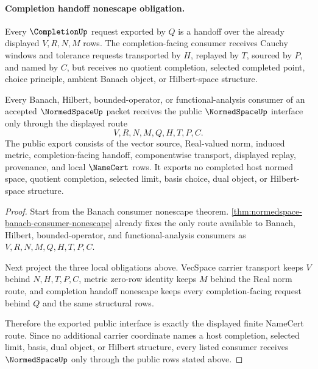 \paragraph{Completion handoff nonescape obligation.}
Every $\CompletionUp$ request exported by $Q$ is a handoff over the already displayed $V,R,N,M$ rows. The completion-facing consumer receives Cauchy windows and tolerance requests transported by $H$, replayed by $T$, sourced by $P$, and named by $C$, but receives no quotient completion, selected completed point, choice principle, ambient Banach object, or Hilbert-space structure.

\begin{theorem}
\label{thm:normed-space-public-namecert-export}
Every Banach, Hilbert, bounded-operator, or functional-analysis consumer of an
accepted $\NormedSpaceUp$ packet receives the public $\NormedSpaceUp$ interface
only through the displayed route
$$
V,R,N,M,Q,H,T,P,C .
$$
The public export consists of the vector source, Real-valued norm, induced
metric, completion-facing handoff, componentwise transport, displayed replay,
provenance, and local $\NameCert$ rows. It exports no completed host normed
space, quotient completion, selected limit, basis choice, dual object, or
Hilbert-space structure.
\end{theorem}
\begin{proof}
Start from the Banach consumer nonescape theorem. \autoref{thm:normedspace-banach-consumer-nonescape} already fixes the only route available to Banach, Hilbert, bounded-operator, and functional-analysis consumers as $V,R,N,M,Q,H,T,P,C$.

Next project the three local obligations above. VecSpace carrier transport keeps $V$ behind $N,H,T,P,C$, metric zero-row identity keeps $M$ behind the Real norm route, and completion handoff nonescape keeps every completion-facing request behind $Q$ and the same structural rows.

Therefore the exported public interface is exactly the displayed finite NameCert route. Since no additional carrier coordinate names a host completion, selected limit, basis, dual object, or Hilbert structure, every listed consumer receives $\NormedSpaceUp$ only through the public rows stated above.
\end{proof}


